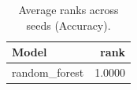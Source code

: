\begin{table}[t]
\centering
\begin{tabular}{lr}
\toprule
Model & rank \\
\midrule
random_forest & 1.0000 \\
\bottomrule
\end{tabular}
\caption{Average ranks across seeds (Accuracy).}
\label{tab:avg_rank_Accuracy}
\end{table}